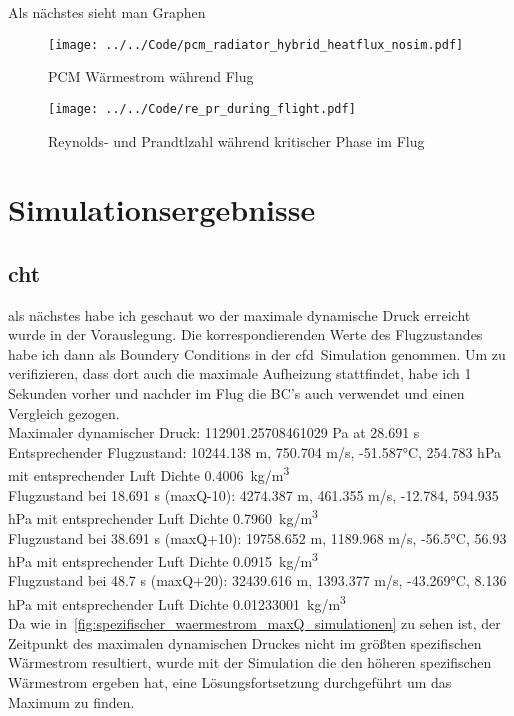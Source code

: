Als nächstes sieht man Graphen

\begin{figure}[H]
  \centering
  \texttt{[image: ../../Code/pcm\_radiator\_hybrid\_heatflux\_nosim.pdf]}\label{fig:pcm_waermestrom_vorauslegung}
  \caption{PCM Wärmestrom während Flug}
  \texttt{[image: ../../Code/re\_pr\_during\_flight.pdf]}\label{fig:re_pr_flugsimulation}
  \caption{Reynolds- und Prandtlzahl während kritischer Phase im Flug}
\end{figure}

\section{Simulationsergebnisse}

\subsection{\texorpdfstring{\ac{cht}}{CHT}}

als nächstes habe ich geschaut wo der maximale dynamische Druck erreicht wurde in der Vorauslegung. Die korrespondierenden Werte des Flugzustandes
habe ich dann als Boundery Conditions in der \ac{cfd}~Simulation genommen.
Um zu verifizieren, dass dort auch die maximale Aufheizung stattfindet, habe ich 1 Sekunden vorher und nachder
im Flug die BC's auch verwendet und einen Vergleich gezogen.\\
Maximaler dynamischer Druck: 112901.25708461029 Pa at 28.691 s\\
Entsprechender Flugzustand: 10244.138 m, 750.704 m/s, -51.587°C, 254.783 hPa mit entsprechender Luft Dichte \SI{0.4006}{kg/m^3}\\
Flugzustand bei 18.691 s (maxQ-10): 4274.387 m, 461.355 m/s, -12.784, 594.935 hPa mit entsprechender Luft Dichte \SI{0.7960}{kg/m^3}\\
Flugzustand bei 38.691 s (maxQ+10): 19758.652 m, 1189.968 m/s, -56.5°C, 56.93 hPa mit entsprechender Luft Dichte \SI{0.0915}{kg/m^3}\\
Flugzustand bei 48.7 s (maxQ+20): 32439.616 m, 1393.377 m/s, -43.269°C, 8.136 hPa mit entsprechender Luft Dichte \SI{0.01233001}{kg/m^3}\\
Da wie in~\ref{fig:spezifischer_waermestrom_maxQ_simulationen} zu sehen ist, der Zeitpunkt des maximalen dynamischen Druckes nicht im größten spezifischen
Wärmestrom resultiert, wurde mit der Simulation die den höheren spezifischen Wärmestrom ergeben hat, eine Lösungsfortsetzung durchgeführt um das Maximum zu finden.\\

